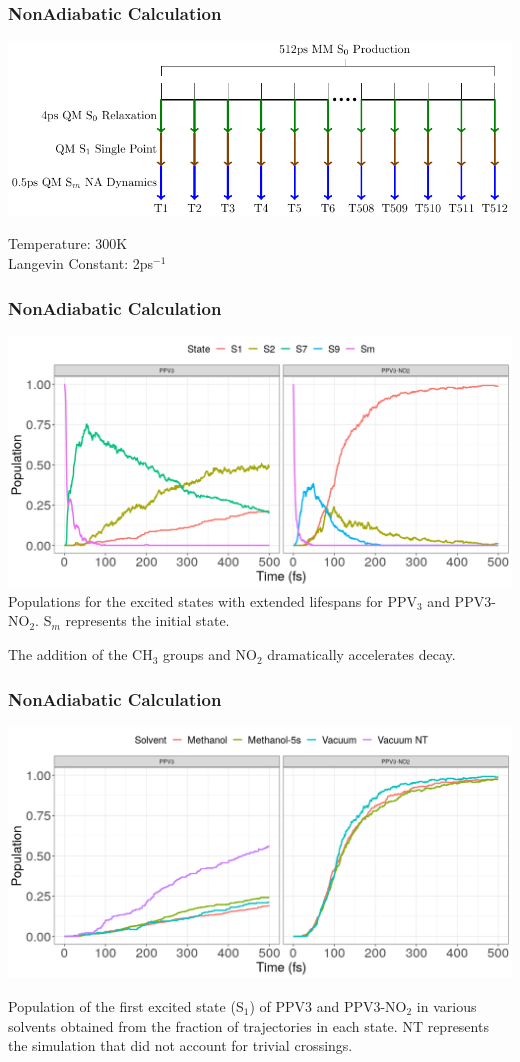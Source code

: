 \documentclass{beamer}
\begin{document}
\begin{frame}
  \frametitle{NonAdiabatic Calculation}
  \includegraphics[width=\textwidth]{scripted_diagrams/nasimulation.pdf}
\begin{block}{}
  Temperature: 300K\\
  Langevin Constant: 2ps$^{-1}$
\end{block}
\end{frame}

\begin{frame}
  \frametitle{NonAdiabatic Calculation}
\includegraphics[width=\textwidth]{Images/all_pops.png}
Populations for the excited states with extended lifespans for PPV$_{3}$ and
PPV3-NO$_2$. S$_{m}$ represents the initial state.

\begin{block}{}
  The addition of the CH$_3$ groups and NO$_2$ dramatically accelerates decay.
\end{block}
\end{frame}

\begin{frame}
  \frametitle{NonAdiabatic Calculation}
  \includegraphics[width=\textwidth]{Images/s1.png}

  Population of the first excited state (S$_1$) of PPV3 and PPV3-NO$_{2}$ in
  various solvents obtained from the fraction of trajectories in each state. NT
  represents the simulation that did not account for trivial crossings.

\end{frame}
\end{document}
